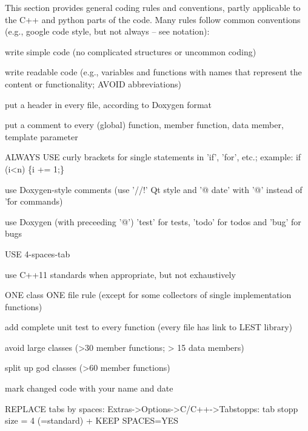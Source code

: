 %
This section provides general coding rules and conventions, partly applicable to the C++ and python parts of the code. Many rules follow common conventions (e.g., google code style, but not always -- see notation):
\bi
    \item write simple code (no complicated structures or uncommon coding)
    \item write readable code (e.g., variables and functions with names that represent the content or functionality; AVOID abbreviations)
    \item put a header in every file, according to Doxygen format
    \item put a comment to every (global) function, member function, data member, template parameter
    \item ALWAYS USE curly brackets for single statements in 'if', 'for', etc.; example: if (i<n) \{i += 1;\}
    \item use Doxygen-style comments (use '//!' Qt style and '@ date' with '@' instead of '\' for commands)
    \item use Doxygen (with preceeding '@') 'test' for tests, 'todo' for todos and 'bug' for bugs
    \item USE 4-spaces-tab
    \item use C++11 standards when appropriate, but not exhaustively
    \item ONE class ONE file rule (except for some collectors of single implementation functions)
    \item add complete unit test to every function (every file has link to LEST library)
    \item avoid large classes (>30 member functions; > 15 data members)
    \item split up god classes (>60 member functions)
    \item mark changed code with your name and date
    \item REPLACE tabs by spaces: Extras->Options->C/C++->Tabstopps: tab stopp size = 4 (=standard) +  KEEP SPACES=YES
\ei

